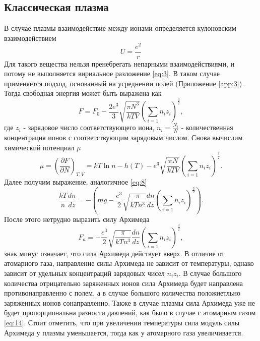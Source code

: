 \documentclass[12pt]{article}
\begin{document}
\subsection*{Классическая плазма}
В случае плазмы взаимодействие между ионами определяется кулоновским взаимодействием 
\[
    U = \frac{e^2}{r}
\] 
Для такого вещества нельзя пренебрегать непарными взаимодействиями, и потому не выполняется вириальное
разложение \ref{eq:3}. В таком случае применяется подход, основанный на усреднении полей (Приложение \ref{app:3}). 
Тогда свободная энергия может быть выражена как 
\begin{equation}
    F = F_0 - \frac{2e^3}{3} \sqrt{\frac{\pi N^3}{kTV}}\left( \sum_{i=1} n_i z_i \right)^\frac{3}{2}, 
    \label{eq:16}
\end{equation}
где $z_i$ - зарядовое число соответствующего иона, $n_i = \frac{N_i}{N}$ - количественная концентрация 
ионов с соответствующим зарядовым числом. Снова вычислим химический потенциал $\mu$
\begin{equation}
    \mu = \left( \frac{\partial F}{\partial N} \right)_{T, V} = kT \ln n - h(T) - e^3 \sqrt{\frac{\pi N}{kTV}}\left( \sum_{i=1} n_i z_i \right)^\frac{3}{2}.
    \label{eq:17}
\end{equation}   
Далее получим выражение, аналогичное \ref{eq:8}
\begin{equation}
    \frac{kT}{n} \frac{dn}{dz} = -\left( mg - \frac{e^3}{2} \sqrt{\frac{\pi}{kTn^3}} \frac{dn}{dz} \left( \sum_{i=1} n_i z_i \right)^\frac{3}{2} \right).
    \label{eq:18}
\end{equation}
После этого нетрудно выразить силу Архимеда
\begin{equation}
    F_a = -\frac{e^3}{2} \sqrt{\frac{\pi}{kTn^3}} \frac{dn}{dz} \left( \sum_{i=1} n_i z_i \right)^\frac{3}{2},
    \label{eq:19}
\end{equation}
знак минус означает, что сила Архимеда действует вверх. В отличие от атомарного газа, направление силы 
Архимеда не зависит от температуры, однако зависит от удельных концентраций зарядовых чисел $n_i z_i$. В случае 
большого количества отрицательно заряженных ионов сила Архимеда будет направлена противонаправленно с полем, 
а в случае большого количества положиетльно заряженных ионов сонаправленно. Также в случае плазмы сила 
Архимеда уже не будет пропорциональна разности давлений, как было в случае с атомарным газом \ref{eq:14}.
Стоит отметить, что при увеличении температуры сила модуль силы Архимеда у плазмы уменьшается, тогда как 
у атомарного газа увеличивается. 
\end{document}
